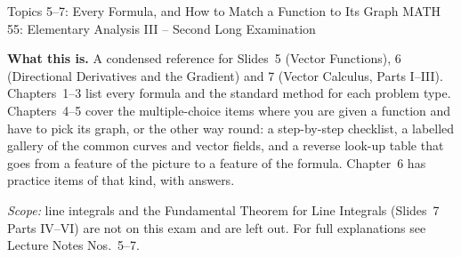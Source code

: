\documentclass[11pt,a4paper]{article}
\begin{document}

  {Topics 5--7: Every Formula, and How to Match a Function to Its Graph}
  {MATH 55: Elementary Analysis III -- Second Long Examination}
  {\textbf{What this is.} A condensed reference for Slides~5 (Vector
   Functions), 6 (Directional Derivatives and the Gradient) and 7 (Vector
   Calculus, Parts I--III). Chapters~1--3 list every formula and the
   standard method for each problem type. Chapters~4--5 cover the
   multiple-choice items where you are given a function and have to pick its
   graph, or the other way round: a step-by-step checklist, a labelled gallery
   of the common curves and vector fields, and a reverse look-up table that
   goes from a feature of the picture to a feature of the formula. Chapter~6
   has practice items of that kind, with answers.\par\medskip
   \emph{Scope:} line integrals and the Fundamental Theorem for Line
   Integrals (Slides~7 Parts IV--VI) are not on this exam and are left out.
   For full explanations see Lecture Notes Nos.~5--7.}

\tableofcontents
\clearpage
{}







\end{document}
